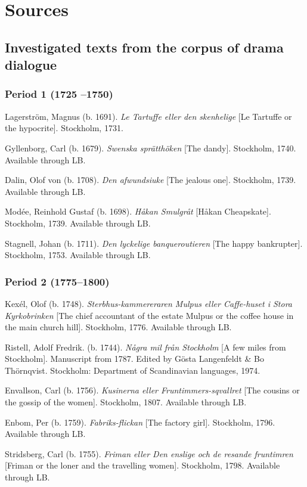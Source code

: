\documentclass[output=paper, colorlinks, citecolor=brown]{langscibook}
\begin{document}
\section*{Sources}

\subsection*{Investigated texts from the corpus of  drama dialogue }
\subsubsection*{Period 1 (1725 –1750)}

\begin{description}[font=\normalfont]\sloppy
\item[1A:] Lagerström, Magnus (b. 1691). \textit{Le Tartuffe eller den skenhelige}  [Le Tartuffe or the hypocrite]. Stockholm, 1731. 
\item[1B:] Gyllenborg, Carl (b. 1679). \textit{Swenska sprätthöken} [The  dandy]. Stockholm, 1740. Available through LB.
\item[1C:] Dalin, Olof von (b. 1708). \textit{Den afwundsiuke} [The jealous one]. Stockholm, 1739. Available through LB. 
\item[1D:] Modée, Reinhold Gustaf (b. 1698). \textit{Håkan Smulgråt} [Håkan Cheapskate]. Stockholm, 1739. Available through LB. 
\item[1E:] Stagnell, Johan (b. 1711). \textit{Den lyckelige banqueroutieren} [The happy bankrupter]. Stockholm, 1753. Available through LB.
\end{description}


\subsubsection*{Period 2 (1775–1800)}
\begin{description}[font=\normalfont]\sloppy
\item[2A:] Kexél, Olof (b. 1748). \textit{Sterbhus-kammereraren Mulpus eller Caffe-huset i Stora Kyrkobrinken} [The chief accountant of the estate Mulpus or the coffee house in the main church hill]. Stockholm, 1776. Available through LB.
\item[2B:] Ristell, Adolf Fredrik. (b. 1744). \textit{Några mil från Stockholm} [A few miles from Stockholm]. Manuscript from 1787. Edited by Gösta Langenfeldt \& Bo Thörnqvist. Stockholm: Department of Scandinavian languages, 1974. 
\item[2C:] Envallson, Carl (b. 1756). \textit{Kusinerna eller Fruntimmers-sqvallret} [The cousins or the gossip of the women]. Stockholm, 1807. Available through LB.
\item[2D:] Enbom, Per (b. 1759). \textit{Fabriks-flickan} [The factory girl]. Stockholm, 1796. Available through LB.
\item[2E:] Stridsberg, Carl (b. 1755). \textit{Friman eller Den enslige och de resande fruntimren} [Friman or the loner and the travelling women]. Stockholm, 1798. Available through LB.
\end{description}
\end{document}
